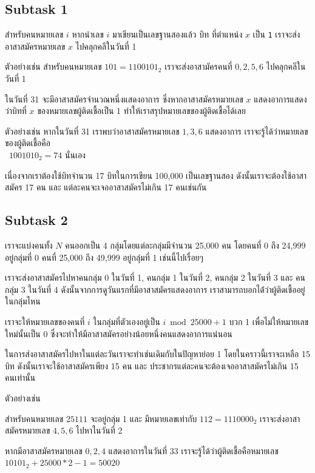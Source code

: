 \documentclass[12pt]{article}
\newcommand{\code}[1]{\texttt{\scriptsize{#1}}}
\begin{document}
\subsection{Subtask 1}

สำหรับคนหมายเลข $i$ หากนำเลข $i$ มาเขียนเป็นเลขฐานสองแล้ว บิท ที่ตำแหน่ง $x$ เป็น \code{1} เราจะส่งอาสาสมัครหมายเลข $x$ ไปคลุกคลีในวันที่ 1

ตัวอย่างเช่น สำหรับคนหมายเลข $101 = 1100101_2$ เราจะส่งอาสามัครคนที่ $0, 2, 5, 6$ ไปคลุกคลีในวันที่ 1

ในวันที่ 31 จะมีอาสาสมัครจำนวณหนึ่งแสดงอาการ ซึ่งหากอาสาสมัครหมายเลข $x$ แสดงอาการแสดงว่าบิทที่ $x$ ของหมายเลขผู้ติดเชื้อเป็น 1 ทำให้เราสรุปหมายเลขของผู้ติดเชื้อได้เลย

ตัวอย่างเช่น หากในวันที่ 31 เราพบว่าอาสาสมัครหมายเลข $1, 3, 6$ แสดงอาการ เราจะรู้ได้ว่าหมายเลขของผู้ติดเชื้อคือ \\\ $1001010_2 = 74$ นั่นเอง

เนื่องจากเราต้องใช้บิทจำนวน 17 บิทในการเขียน 100,000 เป็นเลขฐานสอง ดังนั้นเราจะต้องใช้อาสาสมัคร 17 คน และ แต่ละคนจะเจออาสาสมัครไม่เกิน 17 คนเช่นกัน

\subsection{Subtask 2}

เราจะแบ่งคนทั้ง $N$ คนออกเป็น 4 กลุ่มโดยแต่ละกลุ่มมีจำนวน 25,000 คน โดยคนที่ 0 ถึง 24,999 อยู่กลุ่มที่ 0 คนที่ 25,000 ถึง 49,999 อยู่กลุ่มที่ 1 เช่นนี้ไปเรื่อยๆ

เราจะส่งอาสาสมัครไปหาคนกลุ่ม 0 ในวันที่ 1, คนกลุ่ม 1 ในวันที่ 2, คนกลุ่ม 2 ในวันที่ 3 และ คนกลุ่ม 3 ในวันที่ 4  ดังนั้นจากการดูวันแรกที่มีอาสาสมัครแสดงอาการ เราสามารถบอกได้่ว่าผู้ติดเชื้ออยู่ในกลุ่มไหน

เราจะให้หมายเลขของคนที่ $i$ ในกลุ่มที่ตัวเองอยู่เป็น $i\bmod 25000 + 1$ บวก 1 เพื่อไม่ให้หมายเลขใหม่นั้นเป็น 0 ซึ่งจะทำให้มีอาสาสมัครอย่างน้อยหนึ่งคนแสดงอาการแน่นอน

ในการส่งอาสาสมัครไปหาในแต่ละวันเราจะทำเช่นเดิมกับในปัญหาย่อย 1 โดยในคราวนี้เราจะเหลือ 15 บิท ดังนั้นเราจะใช้อาสาสมัครเพียง 15 คน และ ประชากรแต่ละคนจะต้องเจออาสาสมัครไม่เกิน 15 คนเท่านั้น

ตัวอย่างเช่น

สำหรับคนหมายเลข $25111$ จะอยู่กลุ่ม 1 และ มีหมายเลขเท่ากับ $112 = 1110000_2$ เราจะส่งอาสาสมัครหมายเลข $4, 5, 6$ ไปหาในวันที่ 2 

หากมีอาสาสมัครหมายเลข $0, 2, 4$ แสดงอาการในวันที่ 33 เราจะรู้ได้ว่าผู้ติดเชื้อคือหมายเลข $10101_2 + 25000 * 2 - 1 = 50020$
\end{document}
